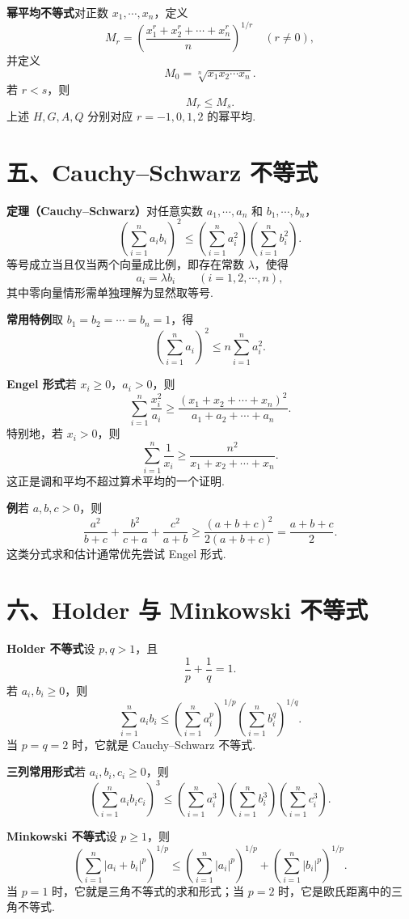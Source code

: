 \documentclass[UTF8,12pt,a4paper,fontset=fandol]{ctexart}
\begin{document}
\noindent\textbf{幂平均不等式}\quad 对正数 $x_1,\cdots,x_n$，定义
\[
  M_r=
  \left(\frac{x_1^r+x_2^r+\cdots+x_n^r}{n}\right)^{1/r}
  \quad(r\ne0),
\]
并定义
\[
  M_0=\sqrt[n]{x_1x_2\cdots x_n}.
\]
若 $r<s$，则
\[
  M_r\le M_s.
\]
上述 $H,G,A,Q$ 分别对应 $r=-1,0,1,2$ 的幂平均.

\section*{五、Cauchy--Schwarz 不等式}

\noindent\textbf{定理（Cauchy--Schwarz）}\quad 对任意实数 $a_1,\cdots,a_n$ 和 $b_1,\cdots,b_n$，
\[
  \left(\sum_{i=1}^n a_i b_i\right)^2
  \le
  \left(\sum_{i=1}^n a_i^2\right)
  \left(\sum_{i=1}^n b_i^2\right).
\]
等号成立当且仅当两个向量成比例，即存在常数 $\lambda$，使得
\[
  a_i=\lambda b_i\qquad (i=1,2,\cdots,n),
\]
其中零向量情形需单独理解为显然取等号.

\noindent\textbf{常用特例}\quad 取 $b_1=b_2=\cdots=b_n=1$，得
\[
  \left(\sum_{i=1}^n a_i\right)^2
  \le
  n\sum_{i=1}^n a_i^2.
\]

\noindent\textbf{Engel 形式}\quad 若 $x_i\ge0$，$a_i>0$，则
\[
  \sum_{i=1}^n \frac{x_i^2}{a_i}
  \ge
  \frac{(x_1+x_2+\cdots+x_n)^2}{a_1+a_2+\cdots+a_n}.
\]
特别地，若 $x_i>0$，则
\[
  \sum_{i=1}^n \frac1{x_i}
  \ge
  \frac{n^2}{x_1+x_2+\cdots+x_n}.
\]
这正是调和平均不超过算术平均的一个证明.

\noindent\textbf{例}\quad 若 $a,b,c>0$，则
\[
  \frac{a^2}{b+c}+\frac{b^2}{c+a}+\frac{c^2}{a+b}
  \ge
  \frac{(a+b+c)^2}{2(a+b+c)}
  =
  \frac{a+b+c}{2}.
\]
这类分式求和估计通常优先尝试 Engel 形式.

\section*{六、Holder 与 Minkowski 不等式}

\noindent\textbf{Holder 不等式}\quad 设 $p,q>1$，且
\[
  \frac1p+\frac1q=1.
\]
若 $a_i,b_i\ge0$，则
\[
  \sum_{i=1}^n a_i b_i
  \le
  \left(\sum_{i=1}^n a_i^p\right)^{1/p}
  \left(\sum_{i=1}^n b_i^q\right)^{1/q}.
\]
当 $p=q=2$ 时，它就是 Cauchy--Schwarz 不等式.

\noindent\textbf{三列常用形式}\quad 若 $a_i,b_i,c_i\ge0$，则
\[
  \left(\sum_{i=1}^n a_i b_i c_i\right)^3
  \le
  \left(\sum_{i=1}^n a_i^3\right)
  \left(\sum_{i=1}^n b_i^3\right)
  \left(\sum_{i=1}^n c_i^3\right).
\]

\noindent\textbf{Minkowski 不等式}\quad 设 $p\ge1$，则
\[
  \left(\sum_{i=1}^n |a_i+b_i|^p\right)^{1/p}
  \le
  \left(\sum_{i=1}^n |a_i|^p\right)^{1/p}
  +
  \left(\sum_{i=1}^n |b_i|^p\right)^{1/p}.
\]
当 $p=1$ 时，它就是三角不等式的求和形式；当 $p=2$ 时，它是欧氏距离中的三角不等式.
\end{document}
